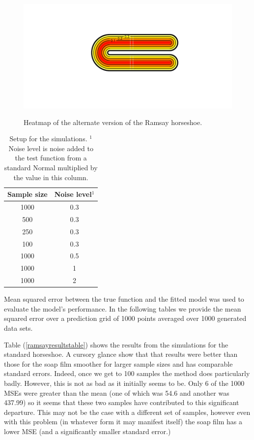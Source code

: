 \documentclass[a4paper,10pt]{amsart}
\begin{document}
\begin{figure}
\centering
\includegraphics[trim=0.5in 1in 0in 0.5in]{figs/altramsayhorseshoe.pdf} \\
\caption{Heatmap of the alternate version of the Ramsay horseshoe.}
\label{altramsayhorseshoe}
\end{figure}

\begin{table}[ht]
\begin{tabular}{c c}\\
Sample size & Noise level$^{1}$ \\
\hline
\hline
1000 & 0.3 \\
500 & 0.3 \\
250 & 0.3 \\
100 & 0.3 \\
1000 & 0.5 \\
1000 & 1 \\
1000 & 2 \\
\end{tabular}
\caption{Setup for the simulations. $^{1}$Noise level is noise added to the test function from a standard Normal multiplied by the value in this column.}
\label{simtable}
\end{table}

Mean squared error between the true function and the fitted model was used to evaluate the model's performance. In the following tables we provide the mean squared error over a prediction grid of 1000 points averaged over 1000 generated data sets.



Table (\ref{ramsayresultstable}) shows the results from the simulations for the standard horseshoe. A cursory glance show that that results were better than those for the soap film smoother for larger sample sizes and has comparable standard errors. Indeed, once we get to 100 samples the method does particularly badly. However, this is not as bad as it initially seems to be. Only 6 of the 1000 MSEs were greater than the mean (one of which was 54.6 and another was 437.99) so it seems that these two samples have contributed to this significant departure. This may not be the case with a different set of samples, however even with this problem (in whatever form it may manifest itself) the soap film has a lower MSE (and a significantly smaller standard error.) 
\end{document}
